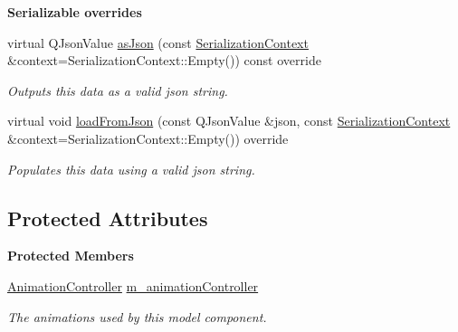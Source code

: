 \begin{Indent}\textbf{ Serializable overrides}\par
\begin{DoxyCompactItemize}
\item 
\mbox{\label{classrev_1_1_bone_animation_component_a5f95b9168d226d048a3f75d00d98f4f5}} 
virtual Q\+Json\+Value \mbox{\hyperlink{classrev_1_1_bone_animation_component_a5f95b9168d226d048a3f75d00d98f4f5}{as\+Json}} (const \mbox{\hyperlink{structrev_1_1_serialization_context}{Serialization\+Context}} \&context=Serialization\+Context\+::\+Empty()) const override
\begin{DoxyCompactList}\small\item\em Outputs this data as a valid json string. \end{DoxyCompactList}\item 
\mbox{\label{classrev_1_1_bone_animation_component_a79dbcac505e75664775b0cae9b1f5016}} 
virtual void \mbox{\hyperlink{classrev_1_1_bone_animation_component_a79dbcac505e75664775b0cae9b1f5016}{load\+From\+Json}} (const Q\+Json\+Value \&json, const \mbox{\hyperlink{structrev_1_1_serialization_context}{Serialization\+Context}} \&context=Serialization\+Context\+::\+Empty()) override
\begin{DoxyCompactList}\small\item\em Populates this data using a valid json string. \end{DoxyCompactList}\end{DoxyCompactItemize}
\end{Indent}
\subsection*{Protected Attributes}
\begin{Indent}\textbf{ Protected Members}\par
\begin{DoxyCompactItemize}
\item 
\mbox{\label{classrev_1_1_bone_animation_component_a6120d7887645ee037b16f8312fe2266e}} 
\mbox{\hyperlink{classrev_1_1_animation_controller}{Animation\+Controller}} \mbox{\hyperlink{classrev_1_1_bone_animation_component_a6120d7887645ee037b16f8312fe2266e}{m\+\_\+animation\+Controller}}
\begin{DoxyCompactList}\small\item\em The animations used by this model component. \end{DoxyCompactList}\end{DoxyCompactItemize}
\end{Indent}
